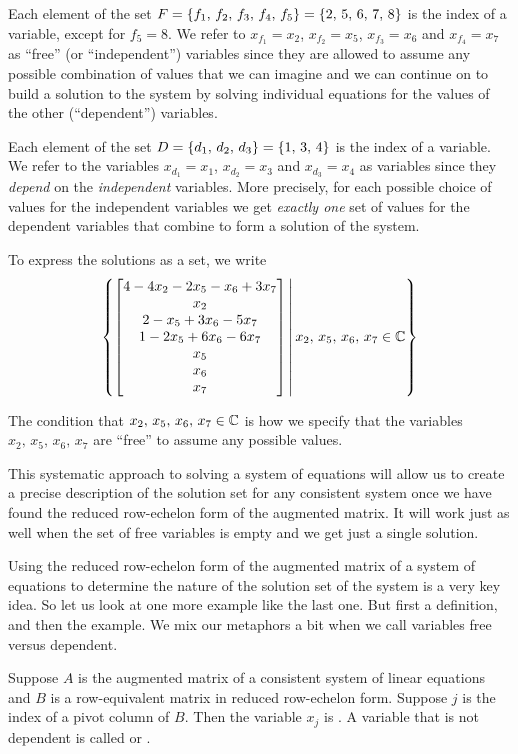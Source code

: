 \documentclass{ximera}
\begin{document}
\begin{example}
Each element of the set $F=\left\{f_1,\,f_2,\,f_3,\,f_4,\,f_5\right\}=\left\{2,\,5,\,6,\,7,\,8\right\}$ is the index of a variable, except for $f_5=8$.  We refer to $x_{f_1}=x_2$, $x_{f_2}=x_5$, $x_{f_3}=x_6$ and $x_{f_4}=x_7$ as ``free'' (or ``independent'') variables since they are allowed to assume any possible combination of values that we can imagine and we can continue on to build a solution to the system by solving individual equations for the values of the other (``dependent'') variables.

Each element of the set $D=\left\{d_1,\,d_2,\,d_3\right\}=\left\{1,\,3,\,4\right\}$ is the index of a variable.  We refer to the variables $x_{d_1}=x_1$, $x_{d_2}=x_3$ and $x_{d_3}=x_4$ as  
 variables since they \textit{depend} on the \textit{independent} variables.  More precisely, for each possible choice of values for the independent variables we get \textit{exactly one} set of values for the dependent variables that combine to form a solution of the system.

To express the solutions as a set, we write
\[
\left\lbrace
\begin{bmatrix}
4-4x_2-2x_5-x_6+3x_7\\
x_2\\
2-x_5+3x_6-5x_7\\
1-2x_5+6x_6-6x_7\\
x_5\\
x_6\\
x_7
\end{bmatrix}
\,\middle|\,
x_2,\,x_5,\,x_6,\,x_7\in\mathbb{C}
\right\rbrace
\]

The condition that $x_2,\,x_5,\,x_6,\,x_7\in\mathbb{C}$ is how we specify that the variables $x_2,\,x_5,\,x_6,\,x_7$ are ``free'' to assume any possible values.
\end{example}

This systematic approach to solving a system of equations will allow us to create a precise description of the solution set for any consistent system once we have found the reduced row-echelon form of the augmented matrix.  It will work just as well when the set of free variables is empty and we get just a single solution.

Using the reduced row-echelon form of the augmented matrix of a system of equations to determine the nature of the solution set of the system is a very key idea.  So let us look at one more example like the last one.  But first a definition, and then the example.   We mix our metaphors a bit when we call variables free versus dependent.

\begin{definition}
Suppose $A$ is the augmented matrix of a consistent system of linear equations and $B$ is a row-equivalent matrix in reduced row-echelon form.  Suppose $j$ is the index of a pivot column of $B$.  Then the variable $x_j$ is .  A variable that is not dependent is called  or .
\end{definition}
\end{document}
